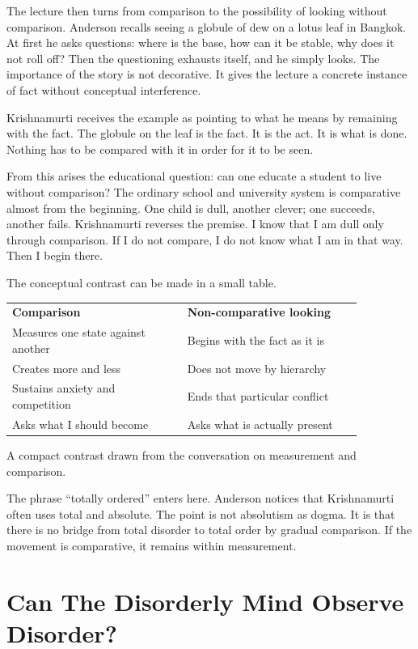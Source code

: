 The lecture then turns from comparison to the possibility of looking without comparison. Anderson recalls seeing a globule of dew on a lotus leaf in Bangkok. At first he asks questions: where is the base, how can it be stable, why does it not roll off? Then the questioning exhausts itself, and he simply looks. The importance of the story is not decorative. It gives the lecture a concrete instance of fact without conceptual interference.

Krishnamurti receives the example as pointing to what he means by remaining with the fact. The globule on the leaf is the fact. It is the act. It is what is done. Nothing has to be compared with it in order for it to be seen.

From this arises the educational question: can one educate a student to live without comparison? The ordinary school and university system is comparative almost from the beginning. One child is dull, another clever; one succeeds, another fails. Krishnamurti reverses the premise. I know that I am dull only through comparison. If I do not compare, I do not know what I am in that way. Then I begin there.

The conceptual contrast can be made in a small table.

\begin{table}
\centering
\begin{tabular}{p{0.43\linewidth} p{0.43\linewidth}}
\textbf{Comparison} & \textbf{Non-comparative looking}\\
Measures one state against another & Begins with the fact as it is\\
Creates more and less & Does not move by hierarchy\\
Sustains anxiety and competition & Ends that particular conflict\\
Asks what I should become & Asks what is actually present\\
\end{tabular}

A compact contrast drawn from the conversation on measurement and comparison.
\end{table}

The phrase ``totally ordered'' enters here. Anderson notices that Krishnamurti often uses total and absolute. The point is not absolutism as dogma. It is that there is no bridge from total disorder to total order by gradual comparison. If the movement is comparative, it remains within measurement.

\section{Can The Disorderly Mind Observe Disorder?}

